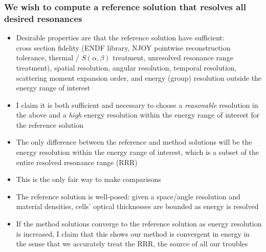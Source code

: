 \documentclass[compress,10pt]{beamer}
\begin{document}
\begin{frame}
    \frametitle{We wish to compute a reference solution that resolves all desired resonances}

    \centering
    \begin{block}{}
        \begin{itemize}
            \item<1-> Desirable properties are that the reference solution have sufficient: \\ {\footnotesize cross section fidelity (ENDF library, NJOY pointwise reconstruction tolerance, thermal / $S(\alpha,\beta)$ treatment, unresolved resonance range treatment), spatial resolution, angular resolution, temporal resolution, scattering moment expansion order, and energy (group) resolution outside the energy range of interest}
            \item<2-> I claim it is both sufficient and necessary to choose a \textit{reasonable} resolution in the above and a \textit{high} energy resolution within the energy range of interest for the reference solution
            \item<3-> The only difference between the reference and method solutions will be the energy resolution within the energy range of interest, which is a subset of the entire resolved resonance range (RRR)
            \item<4-> This is the only fair way to make comparisons %
            \item<5-> The reference solution is well-posed: given a space/angle resolution and material densities, cells' optical thicknesses are bounded as energy is resolved
            \item<6-> If the method solutions converge to the reference solution as energy resolution is increased, I claim that this shows our method is convergent in energy in the sense that we accurately treat the RRR, the source of all our troubles
        \end{itemize}
    \end{block}

\end{frame}

\typeout{***********************************************************************************}
\end{document}
